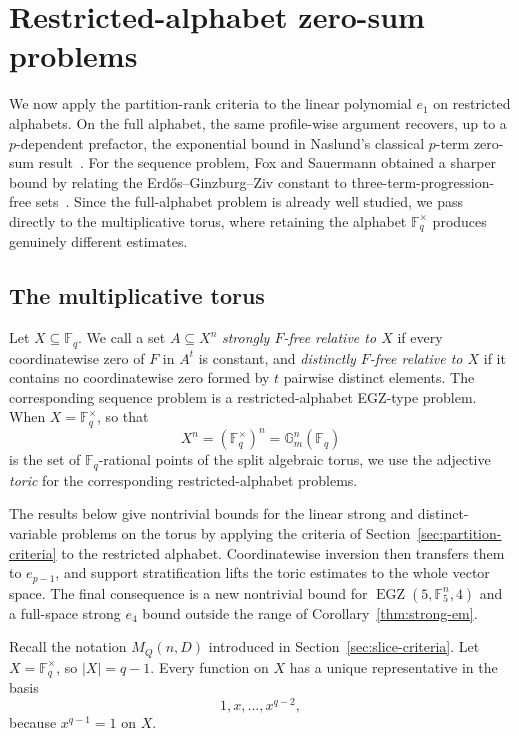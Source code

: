 \documentclass[10pt,a4paper]{amsart}
\theoremstyle{definition}
\newcommand{\F}{\mathbb F}
\newcommand{\1}{\mathbf 1}
\begin{document}
\section{Restricted-alphabet zero-sum problems}\label{sec:zero-sum}

We now apply the partition-rank criteria to the linear polynomial $e_1$ on restricted alphabets.  {On the full alphabet, the same profile-wise argument recovers, up to a $p$-dependent prefactor, the exponential bound in Naslund's classical $p$-term zero-sum result~\cite{NaslundEGZ}.}  For the sequence problem, Fox and Sauermann obtained a sharper bound by relating the Erd\H{o}s--Ginzburg--Ziv constant to three-term-progression-free sets~\cite{FoxSauermann}.  Since the full-alphabet problem is already well studied, we pass directly to the multiplicative torus, where retaining the alphabet $\F_q^\times$ produces genuinely different estimates.

\subsection{The multiplicative torus}

Let $X\subseteq\F_q$.  We call a set $A\subseteq X^n$ \emph{strongly $F$-free relative to $X$} if every coordinatewise zero of $F$ in $A^t$ is constant, and \emph{distinctly $F$-free relative to $X$} if it contains no coordinatewise zero formed by $t$ pairwise distinct elements.  The corresponding sequence problem is a restricted-alphabet EGZ-type problem.  When $X=\F_q^\times$, so that
\[
 X^n=(\F_q^\times)^n=\mathbb G_m^n(\F_q)
\]
is the set of $\F_q$-rational points of the split algebraic torus, we use the adjective \emph{toric} for the corresponding restricted-alphabet problems.

The results below give nontrivial bounds for the linear strong and distinct-variable problems on the torus by applying the criteria of Section~\ref{sec:partition-criteria} to the restricted alphabet.  Coordinatewise inversion then transfers them to $e_{p-1}$, and support stratification lifts the toric estimates to the whole vector space.  The final consequence is a new nontrivial bound for $\operatorname{EGZ}(5,\F_5^n,4)$ and a full-space strong $e_4$ bound outside the range of Corollary~\ref{thm:strong-em}.

Recall the notation $M_Q(n,D)$ introduced in Section~\ref{sec:slice-criteria}.  Let $X=\F_q^\times$, so $|X|=q-1$.  Every function on $X$ has a unique representative in the basis
\[
 1,x,\ldots,x^{q-2},
\]
because $x^{q-1}=1$ on $X$.
\end{document}
